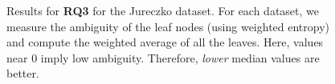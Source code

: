 \def\checkmark{\tikz\fill[scale=0.3](0,.35) -- (.25,0) -- (1,.7) -- (.25,.15) -- cycle;}
\begin{figure}[!h]
\centering
{}

\caption{Results for \textbf{RQ3} for the Jureczko dataset. For each 
dataset, we measure the ambiguity of the leaf nodes (using weighted entropy) and compute the weighted average of all the leaves. Here, values near 0 imply low ambiguity. Therefore, \textit{lower} median values are better.}
\label{fig:rq3}
\end{figure}